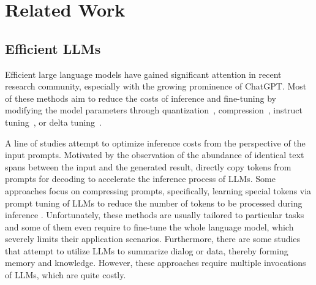 \section{Related Work}


\subsection{Efficient LLMs}

Efficient large language models have gained significant attention in recent research community, especially with the growing prominence of ChatGPT.
Most of these methods aim to reduce the costs of inference and fine-tuning by modifying the model parameters through quantization~\cite{dettmers2022gptint, frantar2023optq, xiao2022smoothquant}, compression~\cite{frantar2023sparsegpt}, instruct tuning~\cite{alpaca,vicuna2023,xu2023wizardlm}, or delta tuning~\cite{hu2022lora}. %

A line of studies attempt to optimize inference costs from the perspective of the input prompts.
Motivated by the observation of the abundance of identical text spans between the input and the generated result, \citet{yang2023inference} directly copy tokens from prompts for decoding to accelerate the inference process of LLMs.
Some approaches focus on compressing prompts, specifically, learning special tokens via prompt tuning of LLMs to reduce the number of tokens to be processed during inference \cite{mu2023learning,ge2022extensible,wingate-etal-2022-prompt,chevalier2023adapting, ge2023context}. 
Unfortunately, these methods are usually tailored to particular tasks and some of them \cite{mu2023learning,chevalier2023adapting} even require to fine-tune the whole language model, which severely limits their application scenarios.
Furthermore, there are some studies~\cite{Chase_LangChain_2022,zhang2023mlcopilot} that attempt to utilize LLMs to summarize dialog or data, thereby forming memory and knowledge. However, these approaches require multiple invocations of LLMs, which are quite costly.

